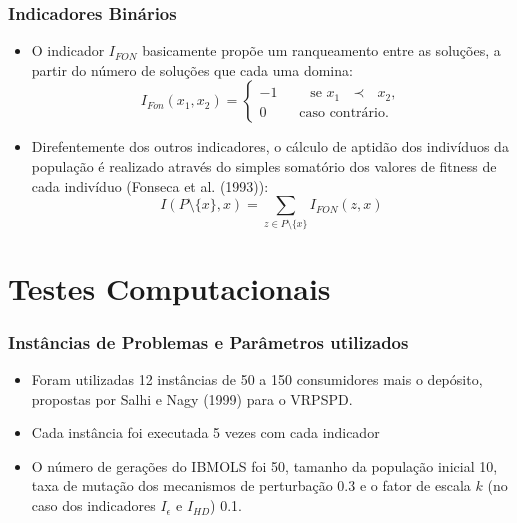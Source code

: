\documentclass{beamer}
\begin{document}
\begin{frame}
 \frametitle{Indicadores Binários}
 \begin{itemize}
  \item O indicador $I_{FON}$ basicamente propõe um ranqueamento entre as soluções, a partir do número de soluções que cada uma domina: 
\begin{equation}
 \label{eq:indicadorfon}
 I_{Fon}(x_1,x_2) =  \begin{cases}
          -1 \qquad \textrm{ se $x_1$ $\prec$ $x_2$},\\
          0 \qquad \textrm{ caso contrário.}
             \end{cases}
\end{equation}
  \item Direfentemente dos outros indicadores, o cálculo de aptidão dos indivíduos da população é realizado através do simples somatório dos valores de fitness de cada 
  indivíduo (Fonseca et al. (1993)):
  \begin{equation}
\label{eq:indicador1}
I(P\setminus\{x\},x) = \sum_{z \in P \setminus \{x\}} I_{FON}(z,x)
\end{equation}

 \end{itemize}
  
\end{frame}

\section{Testes Computacionais}

\begin{frame}
  \frametitle{Instâncias de Problemas e Parâmetros utilizados}
    
    \begin{itemize}
    \item Foram utilizadas 12 instâncias de 50 a 150 consumidores mais o depósito, propostas por Salhi e Nagy (1999) para o VRPSPD.
    \item Cada instância foi executada 5 vezes com cada indicador
    \item O número de gerações do IBMOLS foi 50, tamanho da população inicial 10, taxa de mutação dos mecanismos de perturbação 0.3 e o fator de escala $k$ (no caso dos 
    indicadores $I_{\epsilon}$ e $I_{HD}$) 0.1. 
    \end{itemize}
  
\end{frame}
\end{document}
